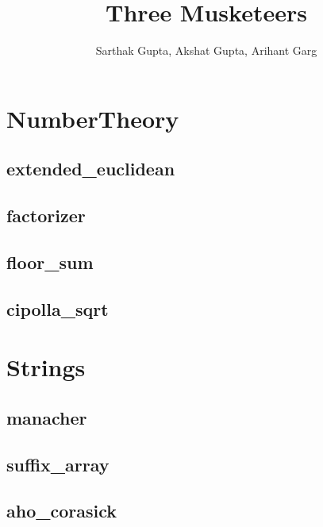 \documentclass[a4paper, twocolumn]{article}
\title{{\Huge Three Musketeers}\\\vspace{5em}{\Large IIT Bhubaneswar}}
\author{Sarthak Gupta, Akshat Gupta, Arihant Garg}
\begin{document}
\begin{titlepage}
\maketitle
\thispagestyle{empty}
\pagebreak
\pagestyle{fancy}
\lhead{}
\rhead{}
\cfoot{}
\tableofcontents
\end{titlepage}

\pagestyle{fancy}
\cfoot{- \thepage \ -}
  
\section{NumberTheory}
\subsection{extended\_euclidean}

\subsection{factorizer}

\subsection{floor\_sum}

\subsection{cipolla\_sqrt}

\section{Strings}
\subsection{manacher}

\subsection{suffix\_array}

\subsection{aho\_corasick}

\end{document}
